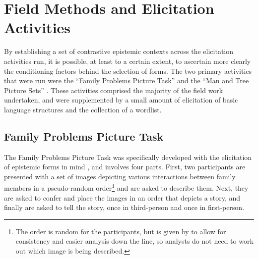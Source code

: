 \section{Field Methods and Elicitation Activities}
By establishing a set of contrastive epistemic contexts across the elicitation activities run, it is possible, at least to a certain extent, to ascertain more clearly the conditioning factors behind the selection of forms. The two primary activities that were run were the ``Family Problems Picture Task'' \cite{SanRoque2012a} and the ``Man and Tree Picture Sets'' \cite{Levinson1992}. These activities comprised the majority of the field work undertaken, and were supplemented by a small amount of elicitation of basic language structures and the collection of a wordlist.

\subsection{Family Problems Picture Task}\label{p:Methods:FamilyProblems}
The Family Problems Picture Task was specifically developed with the elicitation of epistemic forms in mind \cite{SanRoque2012a}, and involves four parts. First, two participants are presented with a set of images \cite{Carroll2009} depicting various interactions between family members in a pseudo-random order\footnote{The order is random for the participants, but is given by  to allow for consistency and easier analysis down the line, so analysts do not need to work out which image is being described.} and are asked to describe them. Next, they are asked to confer and place the images in an order that depicts a story, and finally are asked to tell the story, once in third-person and once in first-person.

